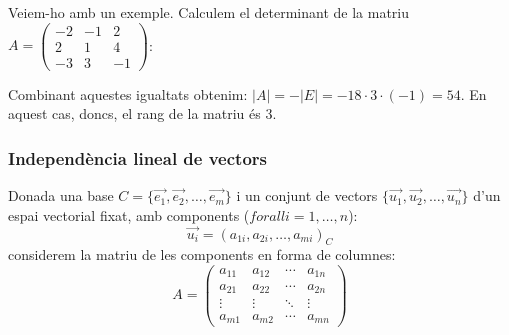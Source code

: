 \documentclass{beamer}
\begin{document}
\begin{frame}
  Veiem-ho amb un exemple. Calculem el determinant de la matriu $A=\begin{pmatrix}-2&-1&2\\2&1&4\\-3&3&-1\end{pmatrix}$:


  Combinant aquestes igualtats obtenim: $|A|=-|E|=-18\cdot 3 \cdot (-1)=54$. En aquest cas, doncs, el rang de la matriu és 3.
\end{frame}
\begin{frame}
  \frametitle{Independència lineal de vectors}
  Donada una base $C=\{ \overrightarrow{e_1},\overrightarrow{e_2},\ldots,\overrightarrow{e_m}\}$ i un conjunt de vectors $\{ \overrightarrow{u_1},\overrightarrow{u_2},\ldots,\overrightarrow{u_n}\}$ d'un espai vectorial fixat, amb components ($forall i = 1,\ldots,n$):
  \[
    \overrightarrow{u_i}=(a_{1i},a_{2i},\ldots,a_{mi})_C
  \]
  considerem la matriu de les components en forma de columnes:
  \[
    A=
      \begin{pmatrix}
        a_{11} & a_{12} & \cdots & a_{1n}\\
        a_{21} & a_{22} & \cdots & a_{2n}\\
        \vdots & \vdots & \ddots & \vdots\\
        a_{m1} & a_{m2} & \cdots & a_{mn}
      \end{pmatrix}
  \]
\end{frame}
\end{document}
